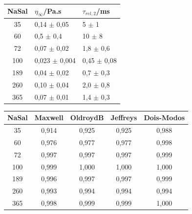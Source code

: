 	\begin{table}[h]
		{%
			\begin{tabular}{c | p{3cm} | p{3cm}}
				\toprule
				NaSal  &  \(\eta_\infty\)/Pa.s          &  \(\tau_{rel,2}\)/ms            \\ \midrule
				35    &  0,14            \(\pm\) 0,05  &  5                \(\pm\) 1     \\
				60    &  0,5             \(\pm\) 0,4   &  10               \(\pm\) 8     \\
				72    &  0,07            \(\pm\) 0,02  &  1,8              \(\pm\) 0,6   \\
				100   &  0,023           \(\pm\) 0,004 &  0,45             \(\pm\) 0,08  \\
				189   &  0,04            \(\pm\) 0,02  &  0,7              \(\pm\) 0,3   \\
				260   &  0,10            \(\pm\) 0,04  &  2,0              \(\pm\) 0,8   \\
				365   &  0,07            \(\pm\) 0,01  &  1,4              \(\pm\) 0,3   \\ \bottomrule
			\end{tabular}
		}{} 
	\end{table}  

	\begin{table}[h]
		{%
			\begin{tabular}{c |c c c c}
				\toprule
				 NaSal  & Maxwell & OldroydB & Jeffreys & Dois-Modos \\ \midrule
				35  & 0,914   & 0,925    & 0,925    & 0,988      \\
				60  & 0,976   & 0,977    & 0,977    & 0,998      \\
				72  & 0,997   & 0,997    & 0,997    & 0,999      \\
				100 & 0,999   & 1,000    & 1,000    & 1,000      \\
				189 & 0,996   & 0,997    & 0,997    & 0,999      \\
				260 & 0,993   & 0,994    & 0,994    & 0,994      \\
				365 & 0,998   & 0,999    & 0,999    & 1,000      \\ \bottomrule
			\end{tabular}
			}{}
	\end{table}  

